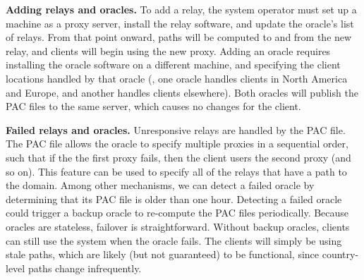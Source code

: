 \textbf{Adding relays and oracles.} To add a relay, the system
operator must set up a machine as a proxy server, install the relay
software, and update the oracle's list of relays.  From that point
onward, paths will be computed to and from the new relay, and clients
will begin using the new proxy.  Adding an oracle requires installing
the oracle software on a different machine, and specifying the client
locations handled by that oracle (\eg, one oracle handles clients in
North America and Europe, and another handles clients elsewhere).
Both oracles will publish the PAC files to the same server, which
causes no changes for the client.

\textbf{Failed relays and oracles.} Unresponsive relays are handled
by the PAC file.  The PAC file allows the oracle to specify multiple
proxies in a sequential order, such that if the the first proxy fails,
then the client users the second proxy (and so on).  This feature can
be used to specify all of the relays that have a path to the domain.
Among other mechanisms, we can detect a failed oracle by determining
that its PAC file is older than one hour.  Detecting a failed oracle
could trigger a backup oracle to re-compute the PAC files
periodically.  Because oracles are stateless, failover is
straightforward.  Without backup oracles, clients can still use the
system when the oracle fails.  The clients will simply be using stale
paths, which are likely (but not guaranteed) to be functional, since
country-level paths change infrequently.


